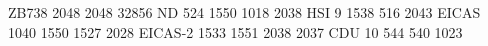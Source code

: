 ZB738 2048 2048 32856
ND        524 1550 1018 2038
HSI         9 1538  516 2043
EICAS    1040 1550 1527 2028
EICAS-2  1533 1551 2038 2037
CDU        10  544  540 1023
